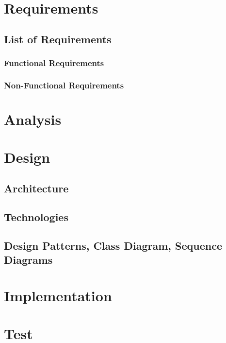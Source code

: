 \documentclass[paper=a4, fontsize=12pt,DIV=14]{scrartcl}    %
\begin{document}
    \newpage
        \section{Requirements}
        	\subsection{List of Requirements}
        		\subsubsection{Functional Requirements}
        		\subsubsection{Non-Functional Requirements}


    \newpage
        \section{Analysis}


    \newpage
        \section{Design}
        	\subsection{Architecture}
        	\subsection{Technologies}
        	\subsection{Design Patterns, Class Diagram, Sequence Diagrams}


    \newpage
        \section{Implementation}



    \newpage
        \section{Test}
\end{document}
